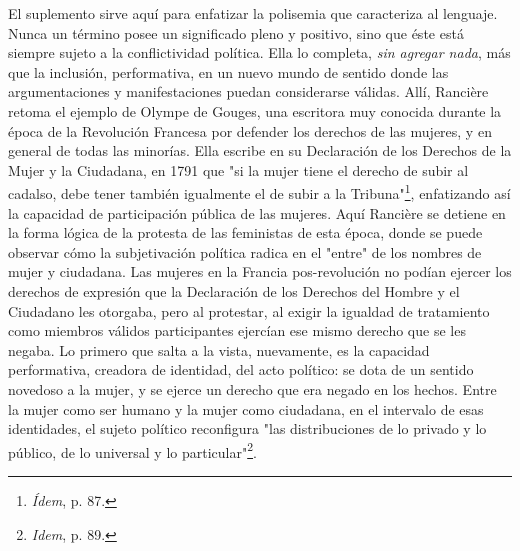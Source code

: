 El suplemento sirve aquí para enfatizar la polisemia que caracteriza al
lenguaje. Nunca un término posee un significado pleno y positivo, sino
que éste está siempre sujeto a la conflictividad política. Ella lo
completa, \emph{sin agregar nada}, más que la inclusión, performativa,
en un nuevo mundo de sentido donde las argumentaciones y manifestaciones
puedan considerarse válidas. Allí, Rancière retoma el ejemplo de Olympe
de Gouges, una escritora muy conocida durante la época de la Revolución
Francesa por defender los derechos de las mujeres, y en general de todas
las minorías. Ella escribe en su Declaración de los Derechos de la Mujer
y la Ciudadana, en 1791 que "si la mujer tiene el derecho de subir al
cadalso, debe tener también igualmente el de subir a la
Tribuna"\footnote{\emph{Ídem}, p. 87.}, enfatizando así la capacidad de
participación pública de las mujeres. Aquí Rancière se detiene en la
forma lógica de la protesta de las feministas de esta época, donde se
puede observar cómo la subjetivación política radica en el "entre" de
los nombres de mujer y ciudadana. Las mujeres en la Francia
pos-revolución no podían ejercer los derechos de expresión que la
Declaración de los Derechos del Hombre y el Ciudadano les otorgaba, pero
al protestar, al exigir la igualdad de tratamiento como miembros válidos
participantes ejercían ese mismo derecho que se les negaba. Lo primero
que salta a la vista, nuevamente, es la capacidad performativa, creadora
de identidad, del acto político: se dota de un sentido novedoso a la
mujer, y se ejerce un derecho que era negado en los hechos. Entre la
mujer como ser humano y la mujer como ciudadana, en el intervalo de esas
identidades, el sujeto político reconfigura "las distribuciones de lo
privado y lo público, de lo universal y lo particular"\footnote{\emph{Idem},
  p. 89.}.

